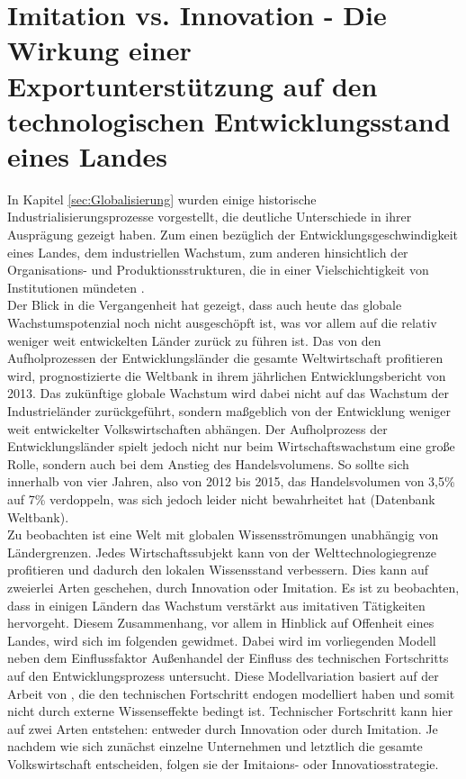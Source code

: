 
\chapter{Imitation vs. Innovation - \newline Die Wirkung einer Exportunterstützung auf den technologischen Entwicklungsstand eines Landes}\label{Papier1}


In Kapitel \ref{sec:Globalisierung} wurden einige historische Industrialisierungsprozesse vorgestellt, die deutliche Unterschiede in ihrer Auspr{\"a}gung gezeigt haben. Zum einen bez{\"u}glich der Entwicklungsgeschwindigkeit eines Landes, dem industriellen Wachstum, zum anderen hinsichtlich der Organisations- und Produktionsstrukturen, die in einer Vielschichtigkeit von Institutionen m{\"u}ndeten \citep{Gerschenkron.1962}.\\


Der Blick in die Vergangenheit hat gezeigt, dass auch heute das globale Wachstumspotenzial noch nicht ausgeschöpft ist, was vor allem auf die relativ weniger weit entwickelten L{\"a}nder zurück zu führen ist. Das von den Aufholprozessen der Entwicklungsl{\"a}nder die gesamte Weltwirtschaft profitieren wird, prognostizierte die Weltbank in ihrem j{\"a}hrlichen Entwicklungsbericht von 2013. Das zuk{\"u}nftige globale Wachstum wird dabei nicht auf das Wachstum der Industriel{\"a}nder zur{\"u}ckgef{\"u}hrt, sondern ma{\ss}geblich von der Entwicklung weniger weit entwickelter Volkswirtschaften abh{\"a}ngen. \newline Der Aufholprozess der Entwicklungsl{\"a}nder spielt jedoch nicht nur beim Wirtschaftswachstum eine gro{\ss}e Rolle, sondern auch bei dem Anstieg des Handelsvolumens. So sollte sich innerhalb von vier Jahren, also von 2012 bis 2015, das Handelsvolumen von 3,5{\%} auf 7{\%} verdoppeln, was sich jedoch leider nicht bewahrheitet hat (Datenbank Weltbank).\\


Zu beobachten ist eine Welt mit globalen Wissensstr{\"o}mungen unabh{\"a}ngig von L{\"a}ndergrenzen. Jedes Wirtschaftssubjekt kann von der Welttechnologiegrenze profitieren und dadurch den lokalen Wissensstand verbessern. Dies kann auf zweierlei Arten geschehen, durch Innovation oder Imitation. Es ist zu beobachten, dass in einigen L{\"a}ndern das Wachstum verst{\"a}rkt aus imitativen T{\"a}tigkeiten hervorgeht. Diesem Zusammenhang, vor allem in Hinblick auf Offenheit eines Landes, wird sich im folgenden gewidmet. Dabei wird im vorliegenden Modell neben dem Einflussfaktor Au{\ss}enhandel der Einfluss des technischen Fortschritts auf den Entwicklungsprozess untersucht. Diese Modellvariation basiert auf der Arbeit von \citet{Acemoglu.2006}, die den technischen Fortschritt endogen modelliert haben und somit nicht durch externe Wissenseffekte bedingt ist. Technischer Fortschritt kann hier auf zwei Arten entstehen: entweder durch Innovation oder durch Imitation. Je nachdem wie sich zunächst einzelne Unternehmen und letztlich die gesamte Volkswirtschaft entscheiden, folgen sie der Imitaions- oder Innovatiosstrategie. \\


